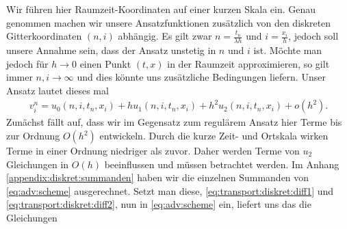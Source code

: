 Wir führen hier Raumzeit-Koordinaten auf einer kurzen Skala ein.
Genau genommen machen wir unsere Ansatzfunktionen zusätzlich von den diskreten Gitterkoordinaten $(n,i)$ abhängig.
Es gilt zwar $n = \frac {t_n} {\lambda h}$ und $i = \frac {x_i}{h}$, jedoch soll unsere Annahme sein, dass der Ansatz unstetig in $n$ und $i$ ist.
Möchte man jedoch für $h \to 0$ einen Punkt $(t,x)$ in der Raumzeit approximieren, so gilt immer $n,i \to \infty$ und dies könnte uns zusätzliche Bedingungen liefern.
Unser Ansatz lautet dieses mal
\begin{align}\label{eq:transport:diskret:ansatz}
v^n_i = u_0(n, i, t_n, x_i) + h u_1(n, i, t_n, x_i) + h^2 u_2(n, i, t_n, x_i) + o(h^2).
\end{align}
Zunächst fällt auf, dass wir im Gegensatz zum regulärem Ansatz hier Terme bis zur Ordnung $O(h^2)$ entwickeln.
Durch die kurze Zeit- und Ortskala wirken Terme in einer Ordnung niedriger als zuvor.
Daher werden Terme von $u_2$ Gleichungen in $O(h)$ beeinflussen und müssen betrachtet werden.
Im Anhang \ref{appendix:diskret:summanden} haben wir die einzelnen Summanden von \eqref{eq:adv:scheme} ausgerechnet.
Setzt man diese, \eqref{eq:transport:diskret:diff1} und \eqref{eq:transport:diskret:diff2}, nun in \eqref{eq:adv:scheme} ein, liefert uns das die Gleichungen

